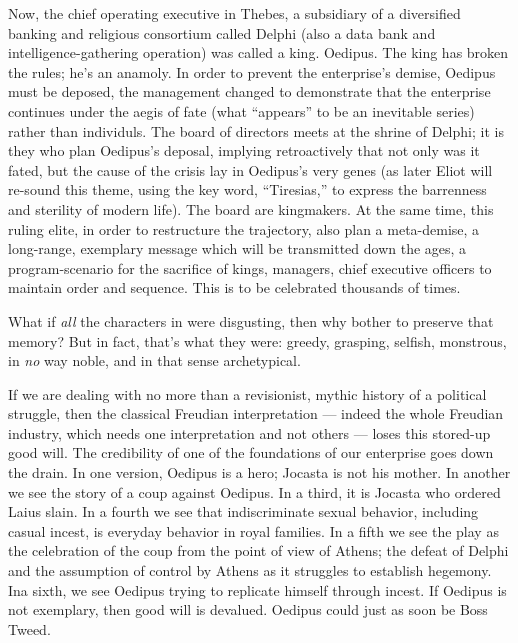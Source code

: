 \documentclass[11pt,twoside,draft]{memoir}
\begin{document}
Now, the chief operating executive in
Thebes, a subsidiary of a diversified banking
and religious consortium called Delphi (also
a data bank and intelligence-gathering operation) was called a king. Oedipus. The
king has broken the rules; he's an anamoly.
In order to prevent the enterprise's demise,
Oedipus must be deposed, the management
changed to demonstrate that the enterprise
continues under the aegis of fate (what \enquote{appears} to be an inevitable series) rather than
individuls. The board of directors meets at
the shrine of Delphi; it is they who plan
Oedipus's deposal, implying retroactively
that not only was it fated, but the cause of the
crisis lay in Oedipus's very genes (as later
Eliot will re-sound this theme, using the key
word, \enquote{Tiresias,} to express the barrenness
and sterility of modern life). The board are
kingmakers. At the same time, this ruling
elite, in order to restructure the trajectory,
also plan a meta-demise, a long-range, exemplary message which will be transmitted
down the ages, a program-scenario for the
sacrifice of kings, managers, chief executive
officers to maintain order and sequence.
This is to be celebrated thousands of times.

What if \emph{all} the characters in  were
disgusting, then why bother to preserve that
memory? But in fact, that's what they were:
greedy, grasping, selfish, monstrous, in \emph{no}
way noble, and in that sense archetypical.

If we are dealing with no more than a
revisionist, mythic history of a political
struggle, then the classical Freudian interpretation --- indeed the whole Freudian industry, which needs one interpretation and not others --- loses this stored-up good will.
The credibility of one of the foundations of
our enterprise goes down the drain. In one
version, Oedipus is a hero; Jocasta is not his
mother. In another we see the story of a coup
against Oedipus. In a third, it is Jocasta who
ordered Laius slain. In a fourth we see that
indiscriminate sexual behavior, including
casual incest, is everyday behavior in royal
families. In a fifth we see the play as the
celebration of the coup from the point of
view of Athens; the defeat of Delphi and the
assumption of control by Athens as it struggles to establish hegemony. Ina sixth, we see
Oedipus trying to replicate himself through
incest. If Oedipus is not exemplary, then
good will is devalued. Oedipus could just as
soon be Boss Tweed.
\end{document}
